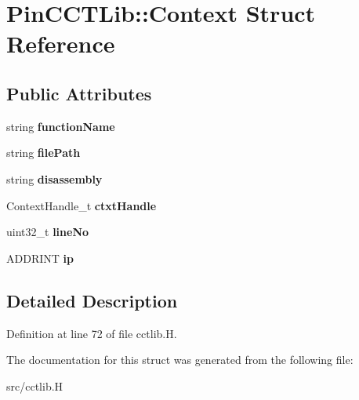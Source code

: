 \hypertarget{structPinCCTLib_1_1Context}{\section{Pin\-C\-C\-T\-Lib\-:\-:Context Struct Reference}
\label{structPinCCTLib_1_1Context}
}
\subsection*{Public Attributes}
\begin{DoxyCompactItemize}
\item 
\hypertarget{structPinCCTLib_1_1Context_acd4ebc378abb36ee3cdf7967a678eb2e}{string {\bfseries function\-Name}}\label{structPinCCTLib_1_1Context_acd4ebc378abb36ee3cdf7967a678eb2e}

\item 
\hypertarget{structPinCCTLib_1_1Context_a30df0fe2f8cd3691c9a621dc54113a4c}{string {\bfseries file\-Path}}\label{structPinCCTLib_1_1Context_a30df0fe2f8cd3691c9a621dc54113a4c}

\item 
\hypertarget{structPinCCTLib_1_1Context_a0bf491d0cf3406f32c6ff3859c6d824b}{string {\bfseries disassembly}}\label{structPinCCTLib_1_1Context_a0bf491d0cf3406f32c6ff3859c6d824b}

\item 
\hypertarget{structPinCCTLib_1_1Context_aae7733a72db5d34ea2161b9e965ac019}{Context\-Handle\-\_\-t {\bfseries ctxt\-Handle}}\label{structPinCCTLib_1_1Context_aae7733a72db5d34ea2161b9e965ac019}

\item 
\hypertarget{structPinCCTLib_1_1Context_aed56f584b7a6e9af66d5d8fecb4dae0b}{uint32\-\_\-t {\bfseries line\-No}}\label{structPinCCTLib_1_1Context_aed56f584b7a6e9af66d5d8fecb4dae0b}

\item 
\hypertarget{structPinCCTLib_1_1Context_add98643f229f6ce10051135965a516b9}{A\-D\-D\-R\-I\-N\-T {\bfseries ip}}\label{structPinCCTLib_1_1Context_add98643f229f6ce10051135965a516b9}

\end{DoxyCompactItemize}


\subsection{Detailed Description}


Definition at line 72 of file cctlib.\-H.



The documentation for this struct was generated from the following file\-:\begin{DoxyCompactItemize}
\item 
src/cctlib.\-H\end{DoxyCompactItemize}
